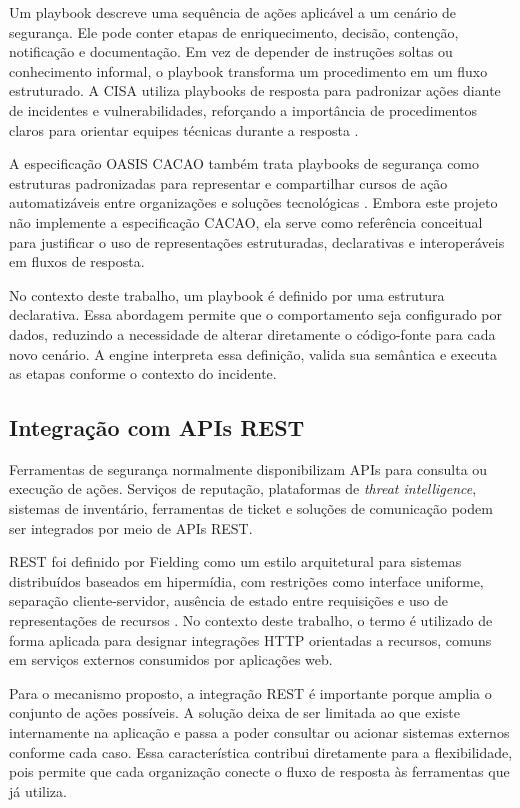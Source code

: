 \documentclass[article,a4paper,12pt,english,brazil,sumario=tradicional]{abntex2}
\begin{document}
Um playbook descreve uma sequência de ações aplicável a um cenário de segurança. Ele pode conter etapas de enriquecimento, decisão, contenção, notificação e documentação. Em vez de depender de instruções soltas ou conhecimento informal, o playbook transforma um procedimento em um fluxo estruturado. A CISA utiliza playbooks de resposta para padronizar ações diante de incidentes e vulnerabilidades, reforçando a importância de procedimentos claros para orientar equipes técnicas durante a resposta \cite{cisa2021}.

A especificação OASIS CACAO também trata playbooks de segurança como estruturas padronizadas para representar e compartilhar cursos de ação automatizáveis entre organizações e soluções tecnológicas \cite{oasisCacao2023}. Embora este projeto não implemente a especificação CACAO, ela serve como referência conceitual para justificar o uso de representações estruturadas, declarativas e interoperáveis em fluxos de resposta.

No contexto deste trabalho, um playbook é definido por uma estrutura declarativa. Essa abordagem permite que o comportamento seja configurado por dados, reduzindo a necessidade de alterar diretamente o código-fonte para cada novo cenário. A engine interpreta essa definição, valida sua semântica e executa as etapas conforme o contexto do incidente.

\subsection{Integração com APIs REST}

Ferramentas de segurança normalmente disponibilizam APIs para consulta ou execução de ações. Serviços de reputação, plataformas de \textit{threat intelligence}, sistemas de inventário, ferramentas de ticket e soluções de comunicação podem ser integrados por meio de APIs REST.

REST foi definido por Fielding como um estilo arquitetural para sistemas distribuídos baseados em hipermídia, com restrições como interface uniforme, separação cliente-servidor, ausência de estado entre requisições e uso de representações de recursos \cite{fielding2000}. No contexto deste trabalho, o termo é utilizado de forma aplicada para designar integrações HTTP orientadas a recursos, comuns em serviços externos consumidos por aplicações web.

Para o mecanismo proposto, a integração REST é importante porque amplia o conjunto de ações possíveis. A solução deixa de ser limitada ao que existe internamente na aplicação e passa a poder consultar ou acionar sistemas externos conforme cada caso. Essa característica contribui diretamente para a flexibilidade, pois permite que cada organização conecte o fluxo de resposta às ferramentas que já utiliza.
\end{document}
